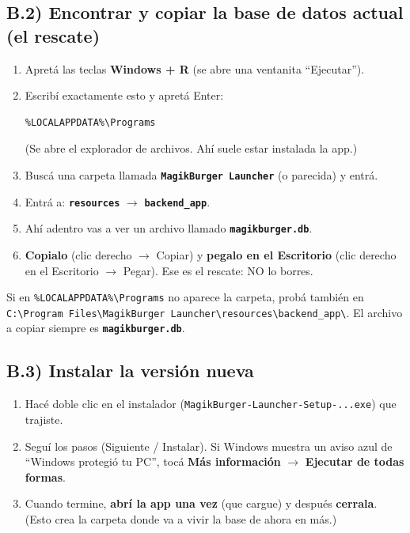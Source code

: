 \documentclass[11pt,a4paper]{article}
\newcommand{\rut}[1]{\texttt{#1}}
\newcommand{\bs}{\textbackslash{}}
\begin{document}
\subsection*{B.2) Encontrar y copiar la base de datos actual (el rescate)}
\begin{enumerate}
  \item Apretá las teclas \textbf{Windows + R} (se abre una ventanita ``Ejecutar'').
  \item Escribí exactamente esto y apretá Enter:
\begin{lstlisting}
%LOCALAPPDATA%\Programs
\end{lstlisting}
        (Se abre el explorador de archivos. Ahí suele estar instalada la app.)
  \item Buscá una carpeta llamada \textbf{\rut{MagikBurger Launcher}} (o parecida) y entrá.
  \item Entrá a: \textbf{\rut{resources}} $\rightarrow$ \textbf{\rut{backend\_app}}.
  \item Ahí adentro vas a ver un archivo llamado \textbf{\rut{magikburger.db}}.
  \item \textbf{Copialo} (clic derecho $\rightarrow$ Copiar) y \textbf{pegalo en el Escritorio}
        (clic derecho en el Escritorio $\rightarrow$ Pegar). Ese es el rescate: NO lo borres.
\end{enumerate}

\begin{nota}
Si en \rut{\%LOCALAPPDATA\%\bs Programs} no aparece la carpeta, probá también en
\rut{C:\bs Program Files\bs MagikBurger Launcher\bs resources\bs backend\_app\bs}.
El archivo a copiar siempre es \textbf{\rut{magikburger.db}}.
\end{nota}

\subsection*{B.3) Instalar la versión nueva}
\begin{enumerate}
  \item Hacé doble clic en el instalador (\rut{MagikBurger-Launcher-Setup-...exe}) que trajiste.
  \item Seguí los pasos (Siguiente / Instalar). Si Windows muestra un aviso azul de
        ``Windows protegió tu PC'', tocá \textbf{Más información} $\rightarrow$
        \textbf{Ejecutar de todas formas}.
  \item Cuando termine, \textbf{abrí la app una vez} (que cargue) y después \textbf{cerrala}.
        (Esto crea la carpeta donde va a vivir la base de ahora en más.)
\end{enumerate}
\end{document}
